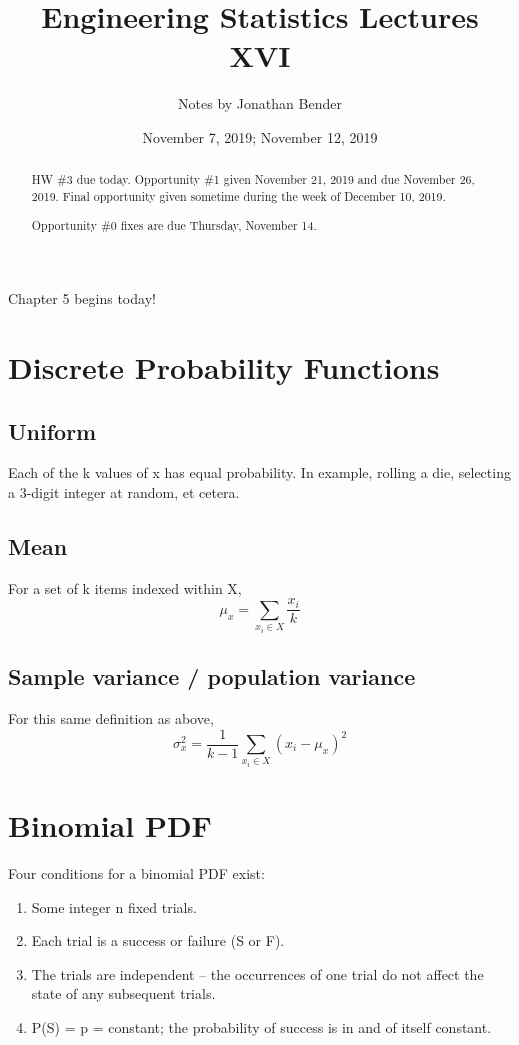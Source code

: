 \documentclass[]{article}
\title{Engineering Statistics Lectures XVI}
\author{Notes by Jonathan Bender}
\date{November 7, 2019; November 12, 2019}
\begin{document}
	
	\maketitle
	
	\begin{abstract}
		HW \#3 due today.
		Opportunity \#1 given November 21, 2019 and due November 26, 2019.
		Final opportunity given sometime during the week of December 10, 2019.
		
		Opportunity \#0 fixes are due Thursday, November 14.
	\end{abstract}

	Chapter 5 begins today!
	
	\section{Discrete Probability Functions}
		\subsection{Uniform}
			Each of the k values of x has equal probability. In example, rolling a die, selecting a 3-digit integer at random, et cetera.
		\subsection{Mean}
			For a set of k items indexed within X,
			$$\mu_x = \sum_{x_i \in X}\dfrac{x_i}{k}$$
		\subsection{Sample variance / population variance}
			For this same definition as above,
			$$\sigma_x^2 = \dfrac{1}{k-1}\sum_{x_i \in X}(x_i - \mu_x)^2$$
	
	\pagebreak
	\section{Binomial PDF}
		Four conditions for a binomial PDF exist:
		
		\begin{enumerate}
			\item Some integer n fixed trials.
			\item Each trial is a success or failure (S or F).
			\item The trials are independent -- the occurrences of one trial do not affect the state of any subsequent trials.
			\item P(S) = p = constant; the probability of success is in and of itself constant.
		\end{enumerate}
	
\end{document}
